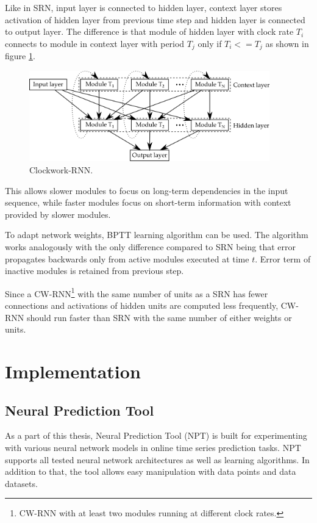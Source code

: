 \documentclass[12pt,oneside]{fithesis2}
\begin{document}
Like in SRN, input layer is connected to hidden layer, context layer stores activation of hidden layer from previous time step and hidden layer is connected to output layer. The difference is that module of hidden layer with clock rate $T_i$ connects to module in context layer with period $T_j$ only if $T_i <= T_j$ as shown in figure \ref{cwrnn}.
	\begin{figure}[ht]
		\centering
		\includegraphics[width=394px]{cw-rnn.png}
		\caption{Clockwork-RNN. }
		\label{cwrnn}
	\end{figure}
This allows slower modules to focus on long-term dependencies in the input sequence, while faster modules focus on short-term information with context provided by slower modules. \par

To adapt network weights, BPTT learning algorithm can be used. The algorithm works analogously with the only difference compared to SRN being that error propagates backwards only from active modules executed at time $t$. Error term of inactive modules is retained from previous step. \par
Since a CW-RNN\footnote{CW-RNN with at least two modules running at different clock rates.} with the same number of units as a SRN has fewer connections and activations of hidden units are computed less frequently, CW-RNN should run faster than SRN with the same number of either weights or units.
      
\chapter{Implementation}
\section{Neural Prediction Tool}
As a part of this thesis, Neural Prediction Tool (NPT) is built for experimenting with various neural network models in online time series prediction tasks. NPT supports all tested neural network architectures as well as learning algorithms. In addition to that, the tool allows easy manipulation with data points and data datasets.
\end{document}
